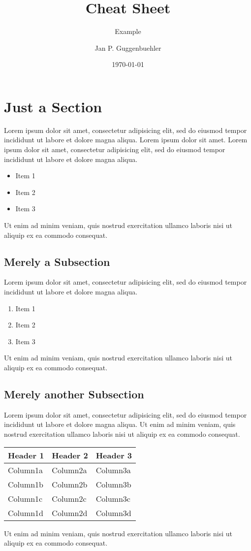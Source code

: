 \documentclass[blue]{modernCS}
\begin{document}
\title{Cheat Sheet}
\subtitle{Example}
\author{Jan P. Guggenbuehler}
\date{\today{}}
\maketitle

\section{Just a Section}
Lorem ipsum dolor sit amet, consectetur adipisicing elit, sed do eiusmod tempor incididunt ut labore et dolore magna aliqua. Lorem ipsum dolor sit amet.
Lorem ipsum dolor sit amet, consectetur adipisicing elit, sed do eiusmod tempor incididunt ut labore et dolore magna aliqua.
\begin{itemize}
	\item Item 1
	\item Item 2
	\item Item 3
\end{itemize}
Ut enim ad minim veniam,
quis nostrud exercitation ullamco laboris nisi ut aliquip ex ea commodo
consequat.

\subsection{Merely a Subsection}
Lorem ipsum dolor sit amet, consectetur adipisicing elit, sed do eiusmod
tempor incididunt ut labore et dolore magna aliqua.
\begin{enumerate}
	\item Item 1
	\item Item 2
	\item Item 3
\end{enumerate}
Ut enim ad minim veniam,
quis nostrud exercitation ullamco laboris nisi ut aliquip ex ea commodo
consequat.

\subsection{Merely another Subsection}
Lorem ipsum dolor sit amet, consectetur adipisicing elit, sed do eiusmod
tempor incididunt ut labore et dolore magna aliqua. Ut enim ad minim veniam, quis nostrud exercitation ullamco laboris nisi ut aliquip ex ea commodo consequat.
\begin{center}
\begin{tabular}{lll}
\toprule
Header 1 & Header 2 & Header 3 \\
\midrule
Column1a & Column2a & Column3a \\
Column1b & Column2b & Column3b \\
Column1c & Column2c & Column3c \\
Column1d & Column2d & Column3d \\
\bottomrule
\end{tabular}
\end{center}
Ut enim ad minim veniam,
quis nostrud exercitation ullamco laboris nisi ut aliquip ex ea commodo
consequat.
\end{document}
